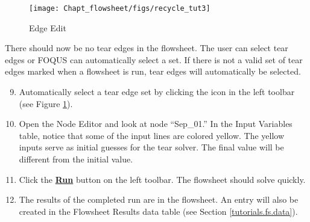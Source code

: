 \begin{figure}[H]
	\begin{center}
		\texttt{[image: Chapt\_flowsheet/figs/recycle\_tut3]}
		\caption{Edge Edit}
		\label{fig.recycle.tut3}
	\end{center}
\end{figure}

There should now be no tear edges in the flowsheet. The user can select tear edges or FOQUS can automatically select a set. If there is not a valid set of tear edges marked when a flowsheet is run, tear edges will automatically be selected.
\begin{enumerate}
	\setcounter{enumi}{8}
	\item Automatically select a tear edge set by clicking the  icon in the left toolbar (see Figure \ref{fig.recycle.tut3}).
	\item Open the Node Editor and look at node ``Sep\_01.''  In the Input Variables table, notice that some of the input lines are colored yellow. The yellow inputs serve as initial guesses for the tear solver. The final value will be different from the initial value.
	\item Click the \textbf{\underline{Run}} button on the left toolbar.  The flowsheet should solve quickly.
	\item The results of the completed run are in the flowsheet.  An entry will also be created in the Flowsheet Results data table (see Section \ref{tutorials.fs.data}).
\end{enumerate}

